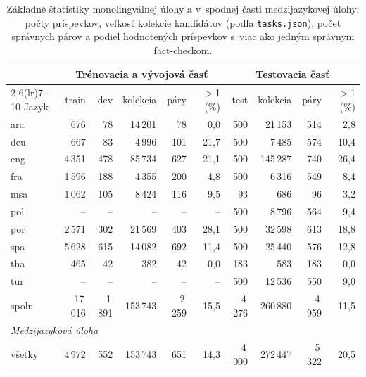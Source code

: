 \begin{table}[t]
\centering
\caption{Základné štatistiky monolingválnej úlohy a v~spodnej časti medzijazykovej úlohy: počty príspevkov, veľkosť kolekcie kandidátov (podľa \texttt{tasks.json}), počet správnych párov a podiel hodnotených príspevkov s~viac ako jedným správnym fact-checkom.}
\label{tab:data}
\setlength{\tabcolsep}{4pt}
\begin{tabular}{l rrrrr @{\hspace{12pt}} rrrr}
\toprule
 & \multicolumn{5}{c}{Trénovacia a vývojová časť} & \multicolumn{4}{c}{Testovacia časť} \\
\cmidrule(lr){2-6}\cmidrule(lr){7-10}
Jazyk & train & dev & kolekcia & páry & $>$1 (\%) & test & kolekcia & páry & $>$1 (\%) \\
\midrule
ara & 676 & 78 & 14\,201 & 78 & 0{,}0 & 500 & 21\,153 & 514 & 2{,}8 \\
deu & 667 & 83 & 4\,996 & 101 & 21{,}7 & 500 & 7\,485 & 574 & 10{,}4 \\
eng & 4\,351 & 478 & 85\,734 & 627 & 21{,}1 & 500 & 145\,287 & 740 & 26{,}4 \\
fra & 1\,596 & 188 & 4\,355 & 200 & 4{,}8 & 500 & 6\,316 & 549 & 8{,}4 \\
msa & 1\,062 & 105 & 8\,424 & 116 & 9{,}5 & 93 & 686 & 96 & 3{,}2 \\
pol & -- & -- & -- & -- & -- & 500 & 8\,796 & 564 & 9{,}4 \\
por & 2\,571 & 302 & 21\,569 & 403 & 28{,}1 & 500 & 32\,598 & 613 & 18{,}8 \\
spa & 5\,628 & 615 & 14\,082 & 692 & 11{,}4 & 500 & 25\,440 & 576 & 12{,}8 \\
tha & 465 & 42 & 382 & 42 & 0{,}0 & 183 & 583 & 183 & 0{,}0 \\
tur & -- & -- & -- & -- & -- & 500 & 12\,536 & 550 & 9{,}0 \\
\midrule
spolu & 17\,016 & 1\,891 & 153\,743 & 2\,259 & 15{,}5 & 4\,276 & 260\,880 & 4\,959 & 11{,}5 \\
\midrule
\multicolumn{10}{l}{\emph{Medzijazyková úloha}} \\
všetky & 4\,972 & 552 & 153\,743 & 651 & 14{,}3 & 4\,000 & 272\,447 & 5\,322 & 20{,}5 \\
\bottomrule
\end{tabular}
\end{table}

